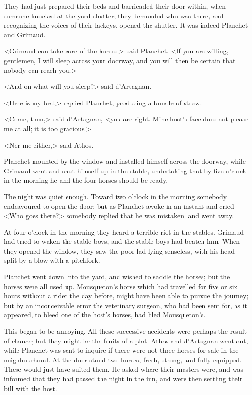 They had just prepared their beds and barricaded their door within, when someone knocked at the yard shutter; they demanded who was there, and recognizing the voices of their lackeys, opened the shutter. It was indeed Planchet and Grimaud. 

<Grimaud can take care of the horses,> said Planchet. <If you are willing, gentlemen, I will sleep across your doorway, and you will then be certain that nobody can reach you.> 

<And on what will you sleep?> said d'Artagnan. 

<Here is my bed,> replied Planchet, producing a bundle of straw. 

<Come, then,> said d'Artagnan, <you are right. Mine host's face does not please me at all; it is too gracious.> 

<Nor me either,> said Athos. 

Planchet mounted by the window and installed himself across the doorway, while Grimaud went and shut himself up in the stable, undertaking that by five o'clock in the morning he and the four horses should be ready. 

The night was quiet enough. Toward two o'clock in the morning somebody endeavoured to open the door; but as Planchet awoke in an instant and cried, <Who goes there?> somebody replied that he was mistaken, and went away. 

At four o'clock in the morning they heard a terrible riot in the stables. Grimaud had tried to waken the stable boys, and the stable boys had beaten him. When they opened the window, they saw the poor lad lying senseless, with his head split by a blow with a pitchfork. 

Planchet went down into the yard, and wished to saddle the horses; but the horses were all used up. Mousqueton's horse which had travelled for five or six hours without a rider the day before, might have been able to pursue the journey; but by an inconceivable error the veterinary surgeon, who had been sent for, as it appeared, to bleed one of the host's horses, had bled Mousqueton's. 

This began to be annoying. All these successive accidents were perhaps the result of chance; but they might be the fruits of a plot. Athos and d'Artagnan went out, while Planchet was sent to inquire if there were not three horses for sale in the neighbourhood. At the door stood two horses, fresh, strong, and fully equipped. These would just have suited them. He asked where their masters were, and was informed that they had passed the night in the inn, and were then settling their bill with the host. 

